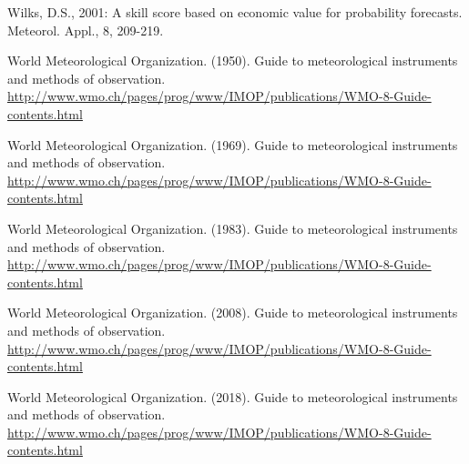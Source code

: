 \begin{thebibliography}{27}
Wilks, D.S., 2001: A skill score based on economic value for probability forecasts. Meteorol. Appl., 8, 209-219.

World Meteorological Organization.  (1950).  Guide to meteorological instruments and methods of observation.  \url{http://www.wmo.ch/pages/prog/www/IMOP/publications/WMO-8-Guide-contents.html}

World Meteorological Organization.  (1969).  Guide to meteorological instruments and methods of observation.  \url{http://www.wmo.ch/pages/prog/www/IMOP/publications/WMO-8-Guide-contents.html}

World Meteorological Organization.  (1983).  Guide to meteorological instruments and methods of observation.  \url{http://www.wmo.ch/pages/prog/www/IMOP/publications/WMO-8-Guide-contents.html}

World Meteorological Organization.  (2008).  Guide to meteorological instruments and methods of observation.  \url{http://www.wmo.ch/pages/prog/www/IMOP/publications/WMO-8-Guide-contents.html}

World Meteorological Organization.  (2018).  Guide to meteorological instruments and methods of observation.  \url{http://www.wmo.ch/pages/prog/www/IMOP/publications/WMO-8-Guide-contents.html}

\end{thebibliography}